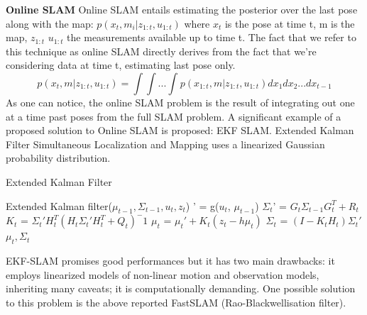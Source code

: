 \textbf{Online SLAM}
Online SLAM entails estimating the posterior over the last pose along with the map:
$p(x_{t},m_{i} | z_{1:t},u_{1:t})$ where $x_{t}$ is the pose at time t, m is the map, $z_{1:t}$ $u_{1:t}$ the measurements available up to time t.
The fact that we refer to this technique as online SLAM directly derives from the fact that we're considering data at time t, estimating last pose only.
\begin{equation}
    p(x_{t}, m | z_{1:t},u_{1:t}) = \int \int ... \int{}^{} p(x_{1:t}, m | z_{1:t}, u_{1:t}) dx_{1}dx_{2} ... dx_{t-1}
\end{equation}
As one can notice, the online SLAM problem is the result of integrating out one at a time past poses from the full SLAM problem.
A significant example of a proposed solution to Online SLAM is proposed: EKF SLAM.
Extended Kalman Filter Simultaneous Localization and Mapping uses a linearized Gaussian probability distribution.


\begin{algorithm}
\caption{Extended Kalman Filter}\label{alg:ekf_slam}
\begin{algorithmic}
\STATE Extended Kalman filter({$\mu_{t-1},\Sigma_{t-1},u_{t},z_{t}$})
\STATE {$\mu$}' = g($u_{t}$, $\mu_{t-1}$)
\STATE $\Sigma_{t}^{}$' = $G_{t}\Sigma_{t-1}^{} G_{t}^{T} + R_{t}$
\STATE $K_{t}$ = $\Sigma_{t}'H_{t}^{T}(H_{t}\Sigma_{t}'H_{t}^{T} + Q_{t})^-1$
\STATE $\mu_{t}$ = $\mu_{t}' + K_{t}(z_{t} - h{\mu_{t}})$
\STATE $\Sigma_{t}$ = $(I - K_{t}H_{t})\Sigma_{t}'$
\RETURN $\mu_{t}, \Sigma_{t}$
\end{algorithmic}
\end{algorithm}

EKF-SLAM promises good performances but it has two main drawbacks: it employs linearized models of non-linear motion and observation models, inheriting many caveats; it is computationally demanding.
One possible solution to this problem is the above reported FastSLAM (Rao-Blackwellisation filter).

